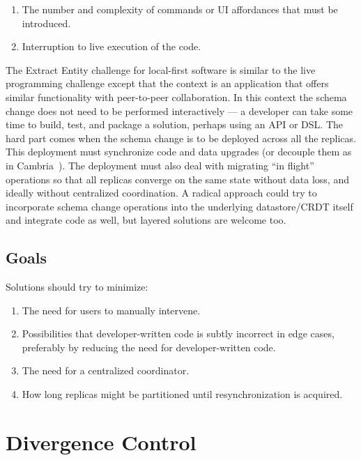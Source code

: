 \documentclass[english,submission]{programming}
\begin{document}
\begin{enumerate}
  \item The number and complexity of commands or UI affordances that must be introduced.
  \item Interruption to live execution of the code.
\end{enumerate}

The Extract Entity challenge for local-first software is similar to the live programming challenge except that the context is an application that offers similar functionality with peer-to-peer collaboration. In this context the schema change does not need to be performed interactively — a developer can take some time to build, test, and package a solution, perhaps using an API or DSL. The hard part comes when the schema change is to be deployed across all the replicas. This deployment must synchronize code and data upgrades (or decouple them as in Cambria~\cite{Cambria}). The deployment must also deal with migrating ``in flight'' operations so that all replicas converge on the same state without data loss, and ideally without centralized coordination. A radical approach could try to incorporate schema change operations into the underlying datastore/CRDT itself and integrate code as well, but layered solutions are welcome too.

\subsection{Goals}
Solutions should try to minimize:

\begin{enumerate}
  \item The need for users to manually intervene.
  \item Possibilities that developer-written code is subtly incorrect in edge cases, preferably by reducing the need for developer-written code.
  \item The need for a centralized coordinator.
  \item How long replicas might be partitioned until resynchronization is acquired.
\end{enumerate}



\section{Divergence Control}
\end{document}
